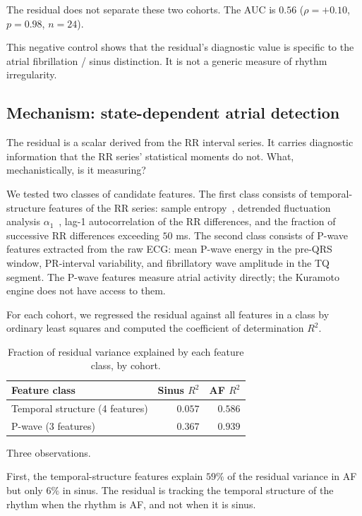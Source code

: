 \documentclass[11pt]{article}
\begin{document}
The residual does not separate these two cohorts. The AUC is $0.56$
($\rho = +0.10$, $p = 0.98$, $n = 24$).

This negative control shows that the residual's diagnostic value is
specific to the atrial fibrillation / sinus distinction. It is not a
generic measure of rhythm irregularity.

\subsection{Mechanism: state-dependent atrial detection}

The residual is a scalar derived from the RR interval series. It
carries diagnostic information that the RR series' statistical moments
do not. What, mechanistically, is it measuring?

We tested two classes of candidate features. The first class consists
of temporal-structure features of the RR series: sample
entropy~\cite{richman2000}, detrended fluctuation analysis
$\alpha_1$~\cite{peng1995}, lag-1 autocorrelation of the RR
differences, and the fraction of successive RR differences exceeding
$50$ ms. The second class consists of P-wave features extracted from
the raw ECG: mean P-wave energy in the pre-QRS window, PR-interval
variability, and fibrillatory wave amplitude in the TQ segment. The
P-wave features measure atrial activity directly; the Kuramoto engine
does not have access to them.

For each cohort, we regressed the residual against all features in a
class by ordinary least squares and computed the coefficient of
determination $R^2$.

\begin{table}[h]
\centering
\begin{tabular}{lrr}
\toprule
Feature class & Sinus $R^2$ & AF $R^2$ \\
\midrule
Temporal structure (4 features) & $0.057$ & $0.586$ \\
P-wave (3 features) & $0.367$ & $0.939$ \\
\bottomrule
\end{tabular}
\caption{Fraction of residual variance explained by each feature class,
by cohort.}
\label{tab:mechanism}
\end{table}

Three observations.

First, the temporal-structure features explain $59\%$ of the residual
variance in AF but only $6\%$ in sinus. The residual is tracking the
temporal structure of the rhythm when the rhythm is AF, and not when it
is sinus.
\end{document}
